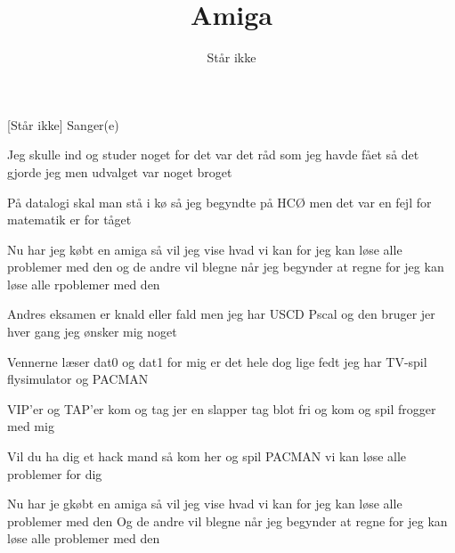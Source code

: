 \documentclass[a4paper,11pt]{article}
\title{Amiga}
\author{Står ikke}
\begin{document}
\maketitle

\begin{roles}
[Står ikke] Sanger(e)
\end{roles}


\begin{song}
%
Jeg skulle ind og studer noget
for det var det råd som jeg havde fået
så det gjorde jeg
men udvalget var noget broget

På datalogi skal man stå i kø
så jeg begyndte på HCØ
men det var en fejl
for matematik er for tåget

Nu har jeg købt en amiga
så vil jeg vise hvad vi kan
for jeg kan løse alle problemer med den
og de andre vil blegne
når jeg begynder at regne
for jeg kan løse alle rpoblemer med den

Andres eksamen er knald eller fald
men jeg har USCD Pscal
og den bruger jer
hver gang jeg ønsker mig noget

Vennerne læser dat0 og dat1
for mig er det hele dog lige fedt
jeg har TV-spil
flysimulator og PACMAN

VIP'er og TAP'er
kom og tag jer en slapper
tag blot fri og kom og spil frogger med mig

Vil du ha dig et hack mand
så kom her og spil PACMAN
vi kan løse alle problemer for dig

Nu har je gkøbt en amiga
så vil jeg vise hvad vi kan
for jeg kan løse alle problemer med den
Og de andre vil blegne
når jeg begynder at regne
for jeg kan løse alle problemer med den
\end{song}
\end{document}
